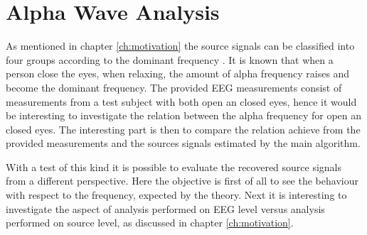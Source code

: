\section{Alpha Wave Analysis}
As mentioned in chapter \ref{ch:motivation} the source signals can be classified into four groups according to the dominant frequency \cite{EEGsignalprocessing}. It is known that when a person close the eyes, when relaxing, the amount of alpha frequency raises and become the dominant frequency. 
The provided EEG measurements consist of measurements from a test subject with both open an closed eyes, hence it would be interesting to investigate the relation between the alpha frequency for open an closed eyes. The interesting part is then to compare the relation achieve from the provided measurements and the sources signals estimated by the main algorithm.

With a test of this kind it is possible to evaluate the recovered source signals from a different perspective. Here the objective is first of all to see the behaviour with respect to the frequency, expected by the theory. Next it is interesting to investigate the aspect of analysis performed on EEG level versus analysis performed on source level, as discussed in chapter \ref{ch:motivation}.              

